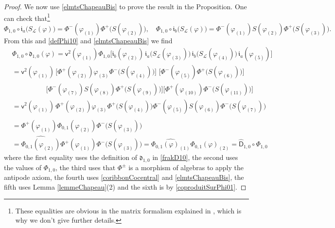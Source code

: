 \documentclass[11pt]{amsart}
\begin{document}
\begin{proof}
\indent We now use \eqref{elmtsChapeauBis} to prove the result in the Proposition. One can check that\footnote{These equalities are obvious in the matrix formalism explained in \cite[\S 3.2]{BFR}, which is why we don't give further details. }
\[ \Phi_{1,0} \circ \mathfrak{i}_a\bigl( S_{\mathcal{L}}(\varphi) \bigr) = \Phi^-(\varphi_{(1)}) \Phi^+\bigl( S(\varphi_{(2)}) \bigr), \quad \Phi_{1,0} \circ \mathfrak{i}_b\bigl( S_{\mathcal{L}}(\varphi) \bigr) = \Phi^-(\varphi_{(1)}) S(\varphi_{(2)}) \Phi^+\bigl( S(\varphi_{(3)}) \bigr). \]
From this and \eqref{defPhi10} and \eqref{elmtsChapeauBis} we find
\begin{align*}
&\Phi_{1,0} \circ \mathfrak{d}_{1,0}(\varphi) = \mathsf{v}^2(\varphi_{(1)}) \Phi_{1,0}\bigl[ \mathfrak{i}_b(\varphi_{(2)}) \, \mathfrak{i}_a\bigl( S_{\mathcal{L}}(\varphi_{(3)}) \bigr) \, \mathfrak{i}_b\bigl( S_{\mathcal{L}}(\varphi_{(4)}) \bigr) \, \mathfrak{i}_a(\varphi_{(5)}) \bigr]\\
&=\mathsf{v}^2(\varphi_{(1)})\, \bigl[ \Phi^+(\varphi_{(2)})\varphi_{(3)}\Phi^-\bigl( S(\varphi_{(4)}) \bigr)\bigr] \, \, \bigl[ \Phi^-(\varphi_{(5)}) \Phi^+\bigl( S(\varphi_{(6)}) \bigr) \bigr]\\
&\qquad\qquad\quad \bigl[ \Phi^-(\varphi_{(7)}) S(\varphi_{(8)}) \Phi^+\bigl( S(\varphi_{(9)}) \bigr) \bigr] \bigl[ \Phi^+(\varphi_{(10)}) \Phi^-\bigl( S(\varphi_{(11)}) \bigr) \bigr]\\
&= \mathsf{v}^2(\varphi_{(1)})\, \Phi^+(\varphi_{(2)})\varphi_{(3)} \Phi^+\bigl( S(\varphi_{(4)}) \bigr) \Phi^-(\varphi_{(5)}) S(\varphi_{(6)}) \Phi^-\bigl( S(\varphi_{(7)}) \bigr)\\
&=\Phi^+(\varphi_{(1)}) \widehat{\Phi_{0,1}(\varphi_{(2)})} \Phi^-\bigl( S(\varphi_{(3)}) \bigr) \\ & = \widehat{\Phi_{0,1}(\varphi_{(2)})} \Phi^+(\varphi_{(1)}) \Phi^-\bigl( S(\varphi_{(3)}) \bigr) = \widehat{\Phi_{0,1}(\varphi)_{(1)}} \Phi_{0,1}(\varphi)_{(2)} = \widehat{\mathsf{D}}_{1,0} \circ \Phi_{1,0}
\end{align*}
where the first equality uses the definition of $\mathfrak{d}_{1,0}$ in \eqref{frakD10}, the second uses the values of $\Phi_{1,0}$, the third uses that $\Phi^\pm$ is a morphism of algebras to apply the antipode axiom, the fourth uses \eqref{coribbonCocentral} and \eqref{elmtsChapeauBis}, the fifth uses Lemma \ref{lemmeChapeau}(2) and the sixth is by \eqref{coproduitSurPhi01}.
\end{proof}
\end{document}

